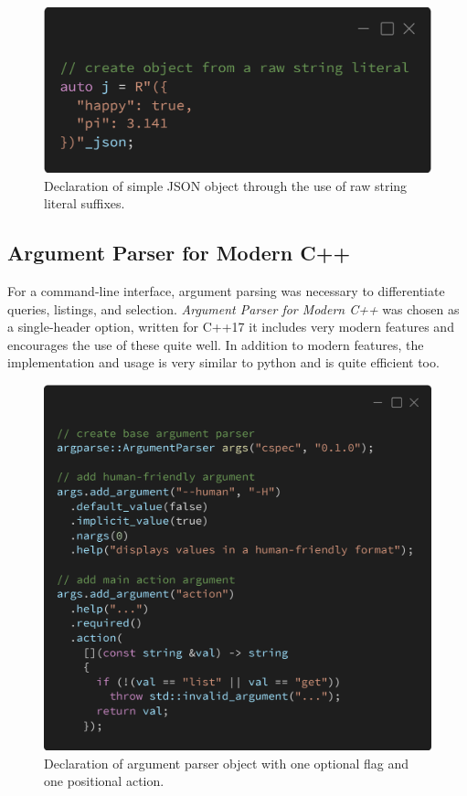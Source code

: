 \documentclass[conference]{IEEEtran}
\begin{document}
\begin{figure}[!t]
    \centering
    \includegraphics[width=\linewidth]{fig-json}
    \caption{Declaration of simple JSON object through the use of raw string literal suffixes.}
    \label{fig-json}
\end{figure}

\subsection{Argument Parser for Modern C++}
For a command-line interface, argument parsing was necessary to differentiate queries, listings, and selection.
\textit{Argument Parser for Modern C++} was chosen as a single-header option, written for C++17 it includes very modern features and encourages the use of these quite well.
In addition to modern features, the implementation and usage is very similar to python and is quite efficient too.

\begin{figure}[!t]
    \centering
    \includegraphics[width=\linewidth]{fig-argparse}
    \caption{Declaration of argument parser object with one optional flag and one positional action.}
    \label{fig-argparse}
\end{figure}
\end{document}
